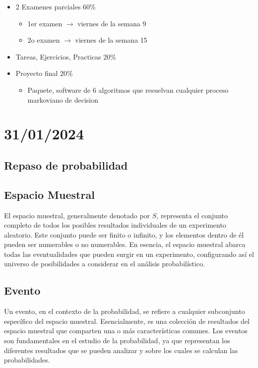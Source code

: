 \documentclass{article}
\begin{document}
\begin{itemize}
    \item 2 Examenes parciales 60\%
          \begin{itemize}
              \item 1er examen $\rightarrow$ viernes de la semana 9
              \item 2o examen $\rightarrow$ viernes de la semana 15
          \end{itemize}
    \item Tareas, Ejercicios, Practicas 20\%
    \item Proyecto final 20\%
          \begin{itemize}
              \item Paquete, software de 6 algoritmos que resuelvan cualquier proceso markoviano de decision
          \end{itemize}
\end{itemize}

\section{31/01/2024}

\subsection{Repaso de probabilidad}

\subsection{Espacio Muestral}

El espacio muestral, generalmente denotado por $S$, representa el conjunto completo de todos los posibles resultados individuales de un experimento aleatorio. Este conjunto puede ser finito o infinito, y los elementos dentro de él pueden ser numerables o no numerables. En esencia, el espacio muestral abarca todas las eventualidades que pueden surgir en un experimento, configurando así el universo de posibilidades a considerar en el análisis probabilístico.

\vspace{.25cm}

\subsection{Evento}

Un evento, en el contexto de la probabilidad, se refiere a cualquier subconjunto específico del espacio muestral. Esencialmente, es una colección de resultados del espacio muestral que comparten una o más características comunes. Los eventos son fundamentales en el estudio de la probabilidad, ya que representan los diferentes resultados que se pueden analizar y sobre los cuales se calculan las probabilidades.
\end{document}

